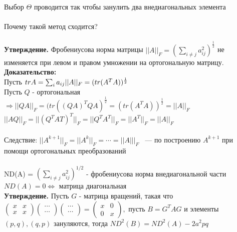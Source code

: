     Выбор $\Theta$ проводится так чтобы занулить два внедиагональных элемента\\
    \\ 
    Почему такой метод сходится?\\ \\ 
\textbf{Утверждение.} Фробениусова норма матрицы \(||A||_F = (\sum_{i \neq j}a_{ij}^2)^{\frac{1}{2}}\) не изменяется при левом и правом умножении на ортогональную матрицу. \\
    
    \textbf{Доказательство:} \\
    Пусть \(tr A = \sum_ia_{ij}\\
    ||A||_F = (tr(A^TA))^{\frac{1}{2}}\) \\
    Пусть \(Q\) - ортогональная \(\Rightarrow ||QA||_F=(tr((QA)^TQA)^{\frac{1}{2}} = (tr(A^TA))^{\frac{1}{2}} = ||A||_F\) \\
    \(||AQ||_F = ||(Q^{T}A{T})^{T}||_{F} = ||Q^{T}A^{T}||_{F} = ||A^{T}||_{F} = ||A||_F\) \\
    \\
    Следствие: \(||A^{k+1}||_F=||A^k||_F=\cdots=||A|||_F\) ~--- по построению \(A^{k+1}\) при помощи ортогональных преобразований \\
    \\
    ND(A) = \((\sum_{i \neq j}a_{ij}^2)^{1/2}\) - фробениусова норма внедиагональной части \\
    \(ND(A) = 0 \Leftrightarrow\) матрица диагональная \\

\textbf{Утверждение.} Пусть \(G\) - матрица вращений, такая что \(
    \begin{pmatrix}
      x & x \\ x & x   
    \end{pmatrix} 
    \begin{pmatrix}
        \cdots \\ \cdots
    \end{pmatrix}
    \begin{pmatrix}
        \cdots \\ \cdots
    \end{pmatrix} = 
    \begin{pmatrix}
      x & 0 \\ 0 & x   
    \end{pmatrix}, 
    \) пусть \(B = G^TAG\) и элементы \((p, q), (q, p)\) зануляются, тогда \(ND^2(B) = ND^2(A) - 2a^2pq\) \\

